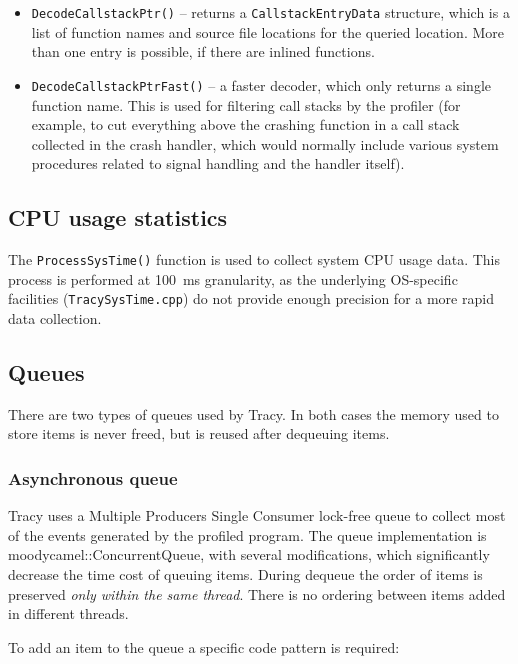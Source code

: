 \documentclass[hidelinks,titlepage,a4paper]{article}
\begin{document}
\begin{itemize}
\item \texttt{DecodeCallstackPtr()} -- returns a \texttt{CallstackEntryData} structure, which is a list of function names and source file locations for the queried location. More than one entry is possible, if there are inlined functions.
\item \texttt{DecodeCallstackPtrFast()} -- a faster decoder, which only returns a single function name. This is used for filtering call stacks by the profiler (for example, to cut everything above the crashing function in a call stack collected in the crash handler, which would normally include various system procedures related to signal handling and the handler itself).
\end{itemize}

\subsection{CPU usage statistics}

The \texttt{ProcessSysTime()} function is used to collect system CPU usage data. This process is performed at 100~\si{\milli\second} granularity, as the underlying OS-specific facilities (\texttt{TracySysTime.cpp}) do not provide enough precision for a more rapid data collection.

\subsection{Queues}

There are two types of queues used by Tracy. In both cases the memory used to store items is never freed, but is reused after dequeuing items.

\subsubsection{Asynchronous queue}

Tracy uses a Multiple Producers Single Consumer lock-free queue to collect most of the events generated by the profiled program. The queue implementation is moodycamel::ConcurrentQueue, with several modifications, which significantly decrease the time cost of queuing items. During dequeue the order of items is preserved \emph{only within the same thread}. There is no ordering between items added in different threads.

To add an item to the queue a specific code pattern is required:
\end{document}
